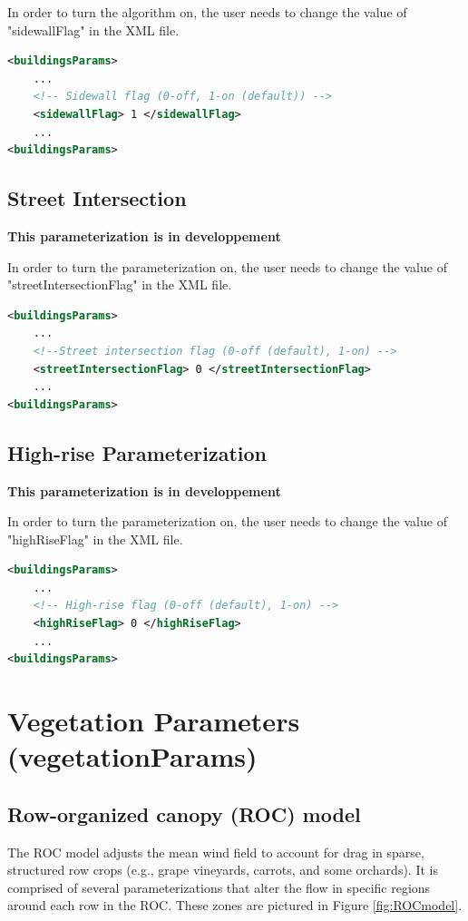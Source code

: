 In order to turn the algorithm on, the user needs to change the value of "sidewallFlag" in the XML file.

\begin{lstlisting}[language=XML]
<buildingsParams>
	...
	<!-- Sidewall flag (0-off, 1-on (default)) -->
	<sidewallFlag> 1 </sidewallFlag>
	...
<buildingsParams>
\end{lstlisting}

\subsection{Street Intersection}

\textbf{This parameterization is in developpement}

In order to turn the parameterization on, the user needs to change the value of "streetIntersectionFlag" in the XML file.

\begin{lstlisting}[language=XML]
<buildingsParams>
	...
	<!--Street intersection flag (0-off (default), 1-on) -->
    <streetIntersectionFlag> 0 </streetIntersectionFlag>
	...
<buildingsParams>
\end{lstlisting}

\subsection{High-rise Parameterization}

\textbf{This parameterization is in developpement}

In order to turn the parameterization on, the user needs to change the value of "highRiseFlag" in the XML file.

\begin{lstlisting}[language=XML]
<buildingsParams>
	...
	<!-- High-rise flag (0-off (default), 1-on) -->
    <highRiseFlag> 0 </highRiseFlag>
	...
<buildingsParams>
\end{lstlisting}


\section{Vegetation Parameters (vegetationParams)}

\subsection{Row-organized canopy (ROC) model}
The ROC model adjusts the mean wind field to account for drag in sparse, structured row crops (e.g., grape vineyards, carrots, and some orchards). It is comprised of several parameterizations that alter the flow in specific regions around each row in the ROC. These zones are pictured in Figure \ref{fig:ROCmodel}.

